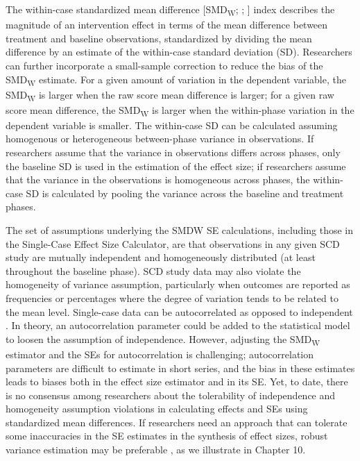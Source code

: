 \documentclass[
]{book}
\begin{document}
The within-case standardized mean difference {[}SMD\textsubscript{W}; \citet{Busk_Serlin_1992}; \citet{Gingerich1984meta}{]} index describes the magnitude of an intervention effect in terms of the mean difference between treatment and baseline observations, standardized by dividing the mean difference by an estimate of the within-case standard deviation (SD). Researchers can further incorporate a small-sample correction to reduce the bias of the SMD\textsubscript{W} estimate. For a given amount of variation in the dependent variable, the SMD\textsubscript{W} is larger when the raw score mean difference is larger; for a given raw score mean difference, the SMD\textsubscript{W} is larger when the within-phase variation in the dependent variable is smaller. The within-case SD can be calculated assuming homogenous or heterogeneous between-phase variance in observations. If researchers assume that the variance in observations differs across phases, only the baseline SD is used in the estimation of the effect size; if researchers assume that the variance in the observations is homogeneous across phases, the within-case SD is calculated by pooling the variance across the baseline and treatment phases.

The set of assumptions underlying the SMDW SE calculations, including those in the Single-Case Effect Size Calculator, are that observations in any given SCD study are mutually independent and homogeneously distributed (at least throughout the baseline phase). SCD study data may also violate the homogeneity of variance assumption, particularly when outcomes are reported as frequencies or percentages \citep{Shadish_Sullivan_2011} where the degree of variation tends to be related to the mean level. Single-case data can be autocorrelated as opposed to independent \citep{matyas1997Serial, Shadish_Sullivan_2011}. In theory, an autocorrelation parameter could be added to the statistical model to loosen the assumption of independence. However, adjusting the SMD\textsubscript{W} estimator and the SEs for autocorrelation is challenging; autocorrelation parameters are difficult to estimate in short series, and the bias in these estimates leads to biases both in the effect size estimator and in its SE. Yet, to date, there is no consensus among researchers about the tolerability of independence and homogeneity assumption violations in calculating effects and SEs using standardized mean differences. If researchers need an approach that can tolerate some inaccuracies in the SE estimates in the synthesis of effect sizes, robust variance estimation may be preferable \citep{Chen_Pustejovsky_2022}, as we illustrate in Chapter 10.
\end{document}
